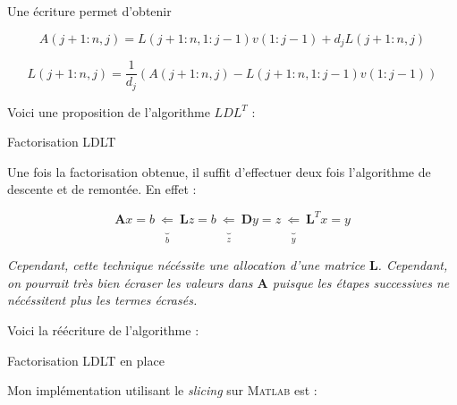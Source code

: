 \documentclass[12pt]{report}
\begin{document}
Une écriture permet d'obtenir

\begin{equation}
A(j+1:n,j) = L(j+1:n, 1:j-1) v(1:j-1) + d_j L(j+1:n, j)
\end{equation}

\begin{equation}
L(j+1:n, j) = \frac{1}{d_j} \left(  A(j+1:n, j) - L(j+1:n, 1:j-1) v(1:j-1) \right)
\end{equation}


Voici une proposition de l'algorithme $LDL^T$ :

\begin{algorithm}[H]
\caption{Factorisation LDLT}\label{alg:two}
\end{algorithm}


Une fois la factorisation obtenue, il suffit d'effectuer deux fois l'algorithme de descente et de remontée. En effet :

\begin{equation}
\mathbf{A}x = b ~\underbrace{\Longleftarrow}_{b} ~\mathbf{L} z = b~ \underbrace{\Longleftarrow}_{z} ~\mathbf{D} y = z~ \underbrace{\Longleftarrow}_{y} ~\mathbf{L}^T x = y
\end{equation}


\textit{Cependant, cette technique nécéssite une allocation d'une matrice $\mathbf{L}$. Cependant, on pourrait très bien écraser les valeurs dans $\mathbf{A}$ puisque les étapes successives ne nécéssitent plus les termes écrasés.}

Voici la réécriture de l'algorithme :

\begin{algorithm}[H]
\caption{Factorisation LDLT en place}\label{alg:two}
\end{algorithm}


Mon implémentation utilisant le \textit{slicing} sur \textsc{Matlab} est :
\end{document}
